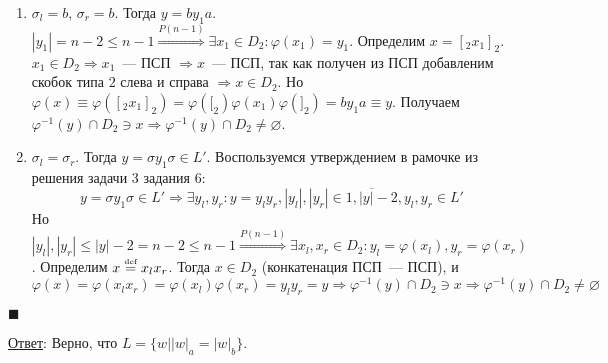 \documentclass[a4paper]{article}
\def\eqdef{\overset{\mbox{\tiny def}}{=}}
\begin{document}
\begin{enumerate}
\begin{enumerate}
\begin{enumerate}
\item $\sigma_l=b,\,\sigma_r=b$. Тогда $y=by_1a$. $|y_1|=n-2\leqslant n-1\overset{P(n-1)}{\Rightarrow}\exists x_1\in D_2\colon \varphi(x_1)=y_1$. Определим $x=[_2x_1]_2$. $x_1\in D_2\Rightarrow x_1$~--- ПСП $\Rightarrow x$~--- ПСП, так как получен из ПСП добавленим скобок типа $2$ слева и справа $\Rightarrow x\in D_2$. Но $\varphi(x)\equiv\varphi([_2x_1]_2)=\varphi([_2)\varphi(x_1)\varphi(]_2)=by_1a\equiv y$. Получаем $\varphi^{-1}(y)\cap D_2\ni x\Rightarrow \varphi^{-1}(y)\cap D_2\neq\varnothing$.
\item $\sigma_l=\sigma_r$. Тогда $y=\sigma y_1\sigma\in L'$. Воспользуемся утверждением в рамочке из решения задачи 3 задания 6:
$$\boxed{y=\sigma y_1\sigma\in L'\Rightarrow\exists y_l,y_r\colon y=y_ly_r, |y_l|, |y_r|\in\overline{1, |y|-2}, y_l,y_r\in L'}$$
Но $|y_l|,|y_r|\leqslant |y|-2=n-2\leqslant n-1\overset{P(n-1)}{\Rightarrow}\exists x_l,x_r\in D_2\colon y_l=\varphi(x_l),y_r=\varphi(x_r)$. Определим $x\eqdef x_lx_r$. Тогда $x\in D_2$ (конкатенация ПСП~--- ПСП), и $\varphi(x)=\varphi(x_lx_r)=\varphi(x_l)\varphi(x_r)=y_ly_r=y\Rightarrow \varphi^{-1}(y)\cap D_2\ni x\Rightarrow\varphi^{-1}(y)\cap D_2\neq\varnothing$
\end{enumerate}
\end{enumerate}
$\blacksquare$
\end{enumerate}
\underline{Ответ}: Верно, что $L=\{w\big||w|_a=|w|_b\}$.
\end{document}
